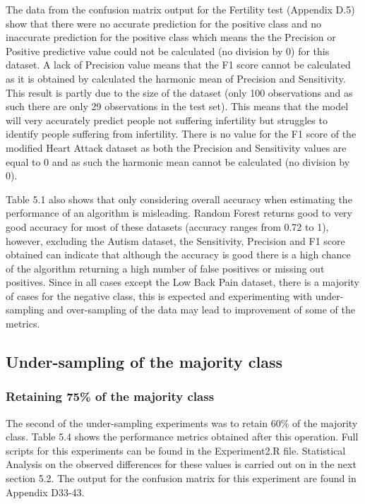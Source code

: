The data from the confusion matrix output for the Fertility test (Appendix D.5)
show that there were no accurate prediction for the positive class and no inaccurate prediction for the positive class which means the the Precision or Positive predictive value could not be calculated (no division by 0) for this dataset. A lack of Precision value means that the F1 score cannot be calculated as it is obtained by calculated the harmonic mean of Precision and Sensitivity.\newline
This result is partly due to the size of the dataset (only 100 observations and as such there are only 29 observations in the test set). This means that the model will very accurately predict people not suffering infertility but struggles to identify people suffering from infertility.\newline
There is no value for the F1 score of the modified Heart Attack dataset as both the Precision and Sensitivity values are equal to 0 and as such the harmonic mean cannot be calculated (no division by 0).

Table 5.1 also shows that only considering overall accuracy when estimating the performance of an algorithm is misleading. Random Forest returns good to very good accuracy for most of these datasets (accuracy ranges from 0.72 to 1), however, excluding the Autism dataset, the Sensitivity, Precision and F1 score obtained can indicate that although the accuracy is good there is a high chance of the algorithm returning a high number of false positives or missing out positives. \newline
Since in all cases except the Low Back Pain dataset, there is a majority of cases for the negative class, this is expected and experimenting with under-sampling and over-sampling of the data may lead to improvement of some of the metrics.


\subsection{Under-sampling of the majority class}
\subsubsection{Retaining 75\% of the majority class}
The second of the under-sampling experiments was to retain 60\% of the majority class. Table 5.4 shows the performance metrics obtained after this operation. Full scripts for this experiments can be found in the Experiment2.R file.
Statistical Analysis on the observed differences for these values is carried out on in the next section 5.2.
The output for the confusion matrix for this experiment are found in Appendix D33-43.

